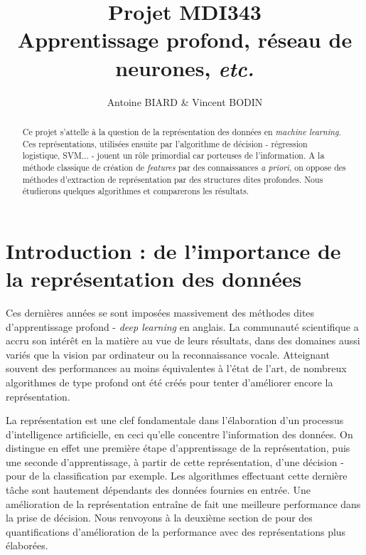 \documentclass[10pt,a4paper]{article}
\title{Projet MDI343 \\
Apprentissage profond, réseau de neurones, \emph{etc.}}
\author{Antoine BIARD \& Vincent BODIN}
\date{}
\begin{document}
\maketitle

\hrulefill
\vspace{2cm}
\renewcommand{\abstractname}{Résumé}
\begin{abstract}
Ce projet s'attelle à la question de la représentation des données en \emph{machine learning}. Ces représentations, utilisées ensuite par l'algorithme de décision - régression logistique, SVM... - jouent un rôle primordial car porteuses de l'information. A la méthode classique de création de \emph{features} par des connaissances \emph{a priori}, on oppose des méthodes d'extraction de représentation par des structures dites profondes. Nous étudierons quelques algorithmes et comparerons les résultats.
\end{abstract}

\newpage
\tableofcontents
\newpage

\section{Introduction : de l'importance de la représentation des données}

Ces dernières années se sont imposées massivement des méthodes dites d'apprentissage profond - \emph{deep learning} en anglais. La communauté scientifique a accru son intérêt en la matière au vue de leurs résultats, dans des domaines aussi variés que la vision par ordinateur ou la reconnaissance vocale. Atteignant souvent des performances au moins équivalentes à l'état de l'art, de nombreux algorithmes de type profond ont été créés pour tenter d'améliorer encore la représentation.

La représentation est une clef fondamentale dans l'élaboration d'un processus d'intelligence artificielle, en ceci qu'elle concentre l'information des données. On distingue en effet une première étape d'apprentissage de la représentation, puis une seconde d'apprentissage, à partir de cette représentation, d'une décision - pour de la classification par exemple. Les algorithmes effectuant cette dernière tâche sont hautement dépendants des données fournies en entrée. Une amélioration de la représentation entraîne de fait une meilleure performance dans la prise de décision. Nous renvoyons à la deuxième section de \cite{DBLP:journals/corr/abs-1206-5538} pour des quantifications d'amélioration de la performance avec des représentations plus élaborées.
\end{document}
